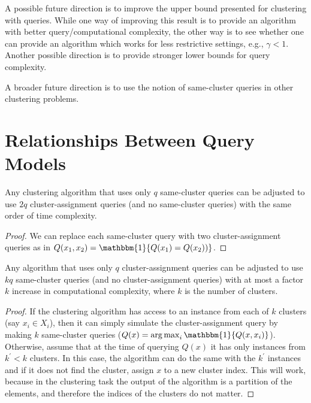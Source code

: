 \documentclass[orivec]{llncs}
\DeclareMathOperator*{\argmax}{arg\,max}
\begin{document}
A possible future direction is to improve the upper bound presented for clustering with queries. While one way of improving this result is to provide an algorithm with better query/computational complexity, the other way is to see whether one can provide an algorithm which works for less restrictive settings, e.g., $\gamma < 1$. Another possible direction is to provide stronger lower bounds for query complexity.

A broader future direction is to use the notion of same-cluster queries in other clustering problems.




\appendix
\section{Relationships Between Query Models}
\label{appendix:diffQueryModels}

\begin{proposition}
Any clustering algorithm that uses only $q$ same-cluster queries can be adjusted to use $2q$ cluster-assignment queries (and no same-cluster queries) with the same order of time complexity.
\end{proposition}
\begin{proof}
We can replace each same-cluster query with two cluster-assignment queries as in $Q(x_1,x_2)={\mathbbm{1}}\{Q(x_1)=Q(x_2))\}$.
\end{proof}

\begin{proposition}
Any algorithm that uses only $q$ cluster-assignment queries can be adjusted to use $kq$ same-cluster queries (and no cluster-assignment queries) with at most a factor $k$ increase in computational complexity, where $k$ is the number of clusters.
\end{proposition}
\begin{proof}
If the clustering algorithm has access to an instance from each of $k$ clusters (say $x_i\in X_i$), then it can simply simulate the cluster-assignment query by making $k$ same-cluster queries ($Q(x) = \argmax_{i}\mathbbm{1}\{Q(x, x_i)\}$). Otherwise, assume that at the time of querying $Q(x)$ it has only instances from $k^\prime<k$ clusters. In this case, the algorithm can do the same with the $k^\prime$ instances and if it does not find the cluster, assign $x$ to a new cluster index. This will work, because in the clustering task the output of the algorithm is a partition of the elements, and therefore the indices of the clusters do not matter.
\end{proof}
\end{document}
